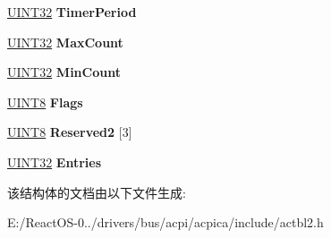 \begin{DoxyCompactItemize}
\item 
\mbox{\label{structacpi__table__wdat_af9e41e811dbdeaec8c15cc3f40eed878}} 
\hyperlink{_processor_bind_8h_ae1e6edbbc26d6fbc71a90190d0266018}{U\+I\+N\+T32} {\bfseries Timer\+Period}
\item 
\mbox{\label{structacpi__table__wdat_afc1130c052d52834d6eda2742d65fc9d}} 
\hyperlink{_processor_bind_8h_ae1e6edbbc26d6fbc71a90190d0266018}{U\+I\+N\+T32} {\bfseries Max\+Count}
\item 
\mbox{\label{structacpi__table__wdat_ae4431bb40b6662091062fdee22ae94ed}} 
\hyperlink{_processor_bind_8h_ae1e6edbbc26d6fbc71a90190d0266018}{U\+I\+N\+T32} {\bfseries Min\+Count}
\item 
\mbox{\label{structacpi__table__wdat_ad93536de4c04ccc5c2e065b31441d031}} 
\hyperlink{_processor_bind_8h_ab27e9918b538ce9d8ca692479b375b6a}{U\+I\+N\+T8} {\bfseries Flags}
\item 
\mbox{\label{structacpi__table__wdat_a6b8e1b0ea26c3876fd0b67468d9d3527}} 
\hyperlink{_processor_bind_8h_ab27e9918b538ce9d8ca692479b375b6a}{U\+I\+N\+T8} {\bfseries Reserved2} \mbox{[}3\mbox{]}
\item 
\mbox{\label{structacpi__table__wdat_a401dca1b5816954e9132afd4b2bb7661}} 
\hyperlink{_processor_bind_8h_ae1e6edbbc26d6fbc71a90190d0266018}{U\+I\+N\+T32} {\bfseries Entries}
\end{DoxyCompactItemize}


该结构体的文档由以下文件生成\+:\begin{DoxyCompactItemize}
\item 
E\+:/\+React\+O\+S-\/0../drivers/bus/acpi/acpica/include/actbl2.\+h\end{DoxyCompactItemize}
